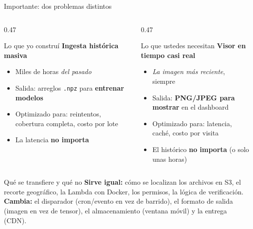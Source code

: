 \documentclass[10pt,aspectratio=169]{beamer}
\begin{document}
\begin{frame}{Importante: dos problemas distintos}
  \begin{columns}[T]
    \begin{column}{0.47\textwidth}
      \begin{block}{Lo que yo construí}
        \textbf{Ingesta histórica masiva}
        \begin{itemize}\small
          \item Miles de horas \emph{del pasado}
          \item Salida: arreglos \texttt{.npz} para \textbf{entrenar modelos}
          \item Optimizado para: reintentos, cobertura completa, costo por lote
          \item La latencia \textbf{no importa}
        \end{itemize}
      \end{block}
    \end{column}
    \begin{column}{0.47\textwidth}
      \begin{block}{Lo que ustedes necesitan}
        \textbf{Visor en tiempo casi real}
        \begin{itemize}\small
          \item \emph{La imagen más reciente}, siempre
          \item Salida: \textbf{PNG/JPEG para mostrar} en el dashboard
          \item Optimizado para: latencia, caché, costo por visita
          \item El histórico \textbf{no importa} (o solo unas horas)
        \end{itemize}
      \end{block}
    \end{column}
  \end{columns}
  \vspace{0.5em}
  \begin{alertblock}{Qué se transfiere y qué no}
    \small
    \textcolor{okgreen}{\textbf{Sirve igual:}} cómo se localizan los archivos en S3,
    el recorte geográfico, la Lambda con Docker, los permisos, la lógica de verificación.\\
    \textcolor{warnred}{\textbf{Cambia:}} el disparador (cron/evento en vez de barrido),
    el formato de salida (imagen en vez de tensor), el almacenamiento (ventana móvil) y
    la entrega (CDN).
  \end{alertblock}
\end{frame}
\end{document}
